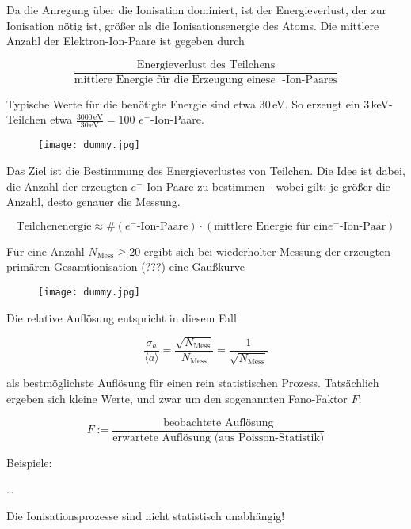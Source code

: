 Da die Anregung über die Ionisation dominiert, ist der Energieverlust, der zur Ionisation nötig ist,
größer als die Ionisationsenergie des Atoms. Die mittlere Anzahl der Elektron-Ion-Paare ist gegeben
durch

\[\frac{\text{Energieverlust des Teilchens}}{\text{mittlere Energie für die Erzeugung eines
$e^-$-Ion-Paares}} \]

Typische Werte für die benötigte Energie sind etwa $30\,$eV. So erzeugt ein $3\,$keV-Teilchen etwa
$\frac{3000\,\text{eV}}{30\,\text{eV}}=100$ $e^-$-Ion-Paare.

\begin{figure}[H]
	\centering
	\texttt{[image: dummy.jpg]}
\end{figure}

Das Ziel ist die Bestimmung des Energieverlustes von Teilchen. Die Idee ist dabei, die Anzahl der
erzeugten $e^-$-Ion-Paare zu bestimmen - wobei gilt: je größer die Anzahl, desto genauer die
Messung.

\[\text{Teilchenenergie}\approx \#(\text{$e^-$-Ion-Paare})\cdot (\text{mittlere Energie für ein
$e^-$-Ion-Paar})\]

Für eine Anzahl $N_{\text{Mess}}\ge 20$ ergibt sich bei wiederholter Messung der erzeugten primären
Gesamtionisation (???) eine Gaußkurve

\begin{figure}[H]
	\centering
	\texttt{[image: dummy.jpg]}
\end{figure}

Die relative Auflösung entspricht in diesem Fall

\[\frac{\sigma_{a}}{\langle a \rangle} =
\frac{\sqrt{N_{\text{Mess}}}}{N_{\text{Mess}}}=\frac{1}{\sqrt{N_{\text{Mess}}}}
\]

als bestmöglichste Auflösung für einen rein statistischen Prozess. Tatsächlich ergeben sich kleine
Werte, und zwar um den sogenannten Fano-Faktor $F$:

\[ F:=\frac{\text{beobachtete Auflösung}}{\text{erwartete Auflösung (aus Poisson-Statistik)}} \]

Beispiele:

\ldots

Die Ionisationsprozesse sind nicht statistisch unabhängig!

